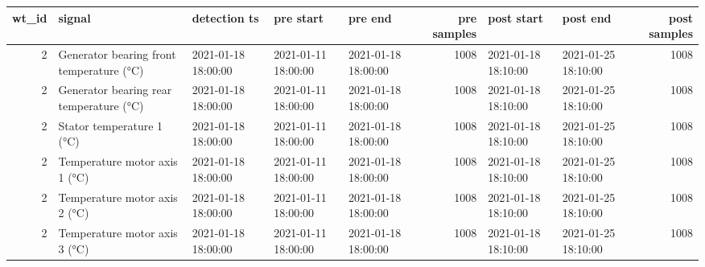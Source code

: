 \begin{tabular}{rllllrllr}
\toprule
wt\_id & signal & detection ts & pre start & pre end & pre samples & post start & post end & post samples \\
\midrule
2 & Generator bearing front temperature (°C) & 2021-01-18 18:00:00 & 2021-01-11 18:00:00 & 2021-01-18 18:00:00 & 1008 & 2021-01-18 18:10:00 & 2021-01-25 18:10:00 & 1008 \\
2 & Generator bearing rear temperature (°C) & 2021-01-18 18:00:00 & 2021-01-11 18:00:00 & 2021-01-18 18:00:00 & 1008 & 2021-01-18 18:10:00 & 2021-01-25 18:10:00 & 1008 \\
2 & Stator temperature 1 (°C) & 2021-01-18 18:00:00 & 2021-01-11 18:00:00 & 2021-01-18 18:00:00 & 1008 & 2021-01-18 18:10:00 & 2021-01-25 18:10:00 & 1008 \\
2 & Temperature motor axis 1 (°C) & 2021-01-18 18:00:00 & 2021-01-11 18:00:00 & 2021-01-18 18:00:00 & 1008 & 2021-01-18 18:10:00 & 2021-01-25 18:10:00 & 1008 \\
2 & Temperature motor axis 2 (°C) & 2021-01-18 18:00:00 & 2021-01-11 18:00:00 & 2021-01-18 18:00:00 & 1008 & 2021-01-18 18:10:00 & 2021-01-25 18:10:00 & 1008 \\
2 & Temperature motor axis 3 (°C) & 2021-01-18 18:00:00 & 2021-01-11 18:00:00 & 2021-01-18 18:00:00 & 1008 & 2021-01-18 18:10:00 & 2021-01-25 18:10:00 & 1008 \\
\bottomrule
\end{tabular}
